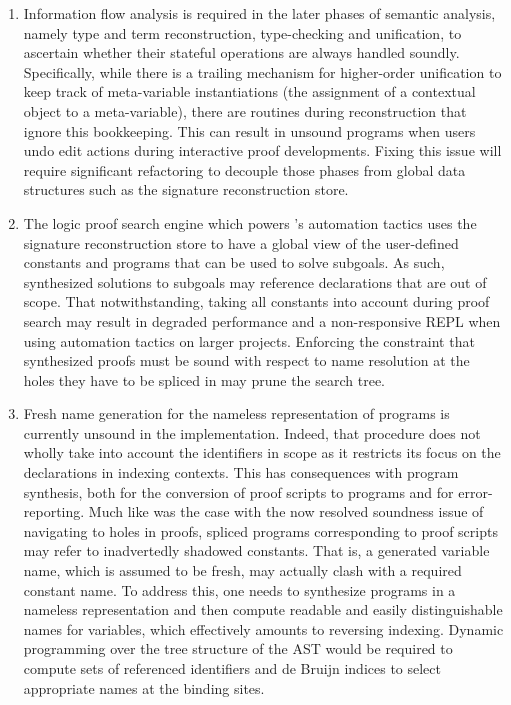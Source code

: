 \begin{enumerate}
\item
Information flow analysis is required in the later phases of semantic analysis, namely type and term reconstruction, type-checking and unification, to ascertain whether their stateful operations are always handled soundly.
Specifically, while there is a trailing mechanism for higher-order unification to keep track of meta-variable instantiations (the assignment of a contextual object to a meta-variable), there are routines during \LF reconstruction that ignore this bookkeeping.
This can result in unsound programs when users undo edit actions during interactive proof developments.
Fixing this issue will require significant refactoring to decouple those phases from global data structures such as the signature reconstruction store.
\item
The logic proof search engine which powers \Harpoon's automation tactics uses the signature reconstruction store to have a global view of the user-defined constants and programs that can be used to solve subgoals.
As such, synthesized solutions to subgoals may reference declarations that are out of scope.
That notwithstanding, taking all constants into account during proof search may result in degraded performance and a non-responsive \ac{REPL} when using automation tactics on larger projects.
Enforcing the constraint that synthesized proofs must be sound with respect to name resolution at the holes they have to be spliced in may prune the search tree.
\item
Fresh name generation for the nameless representation of \Beluga programs is currently unsound in the implementation.
Indeed, that procedure does not wholly take into account the identifiers in scope as it restricts its focus on the declarations in indexing contexts.
This has consequences with program synthesis, both for the conversion of \Harpoon proof scripts to \Beluga programs and for error-reporting.
Much like was the case with the now resolved soundness issue of navigating to holes in \Harpoon proofs, spliced \Beluga programs corresponding to \Harpoon proof scripts may refer to inadvertedly shadowed constants.
That is, a generated variable name, which is assumed to be fresh, may actually clash with a required constant name.
To address this, one needs to synthesize programs in a nameless representation and then compute readable and easily distinguishable names for variables, which effectively amounts to reversing indexing.
Dynamic programming over the tree structure of the \ac{AST} would be required to compute sets of referenced identifiers and de Bruijn indices to select appropriate names at the binding sites.
\end{enumerate}

